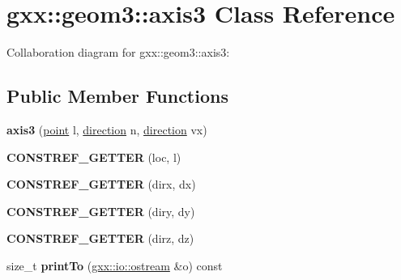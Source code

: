 \hypertarget{classgxx_1_1geom3_1_1axis3}{}\section{gxx\+:\+:geom3\+:\+:axis3 Class Reference}
\label{classgxx_1_1geom3_1_1axis3}


Collaboration diagram for gxx\+:\+:geom3\+:\+:axis3\+:
\subsection*{Public Member Functions}
\begin{DoxyCompactItemize}
\item 
{\bfseries axis3} (\hyperlink{classgxx_1_1geom3_1_1point}{point} l, \hyperlink{classgxx_1_1geom3_1_1direction}{direction} n, \hyperlink{classgxx_1_1geom3_1_1direction}{direction} vx)\hypertarget{classgxx_1_1geom3_1_1axis3_ad60e27afc66929ac5579565719af4be3}{}\label{classgxx_1_1geom3_1_1axis3_ad60e27afc66929ac5579565719af4be3}

\item 
{\bfseries C\+O\+N\+S\+T\+R\+E\+F\+\_\+\+G\+E\+T\+T\+ER} (loc, l)\hypertarget{classgxx_1_1geom3_1_1axis3_ac4a6a1138d9fbb0b5400d953e2de1e4f}{}\label{classgxx_1_1geom3_1_1axis3_ac4a6a1138d9fbb0b5400d953e2de1e4f}

\item 
{\bfseries C\+O\+N\+S\+T\+R\+E\+F\+\_\+\+G\+E\+T\+T\+ER} (dirx, dx)\hypertarget{classgxx_1_1geom3_1_1axis3_a84d77864f3562a9bd409bb4ccb6dc267}{}\label{classgxx_1_1geom3_1_1axis3_a84d77864f3562a9bd409bb4ccb6dc267}

\item 
{\bfseries C\+O\+N\+S\+T\+R\+E\+F\+\_\+\+G\+E\+T\+T\+ER} (diry, dy)\hypertarget{classgxx_1_1geom3_1_1axis3_a1fc769c2c97f01447730bbc2e605239c}{}\label{classgxx_1_1geom3_1_1axis3_a1fc769c2c97f01447730bbc2e605239c}

\item 
{\bfseries C\+O\+N\+S\+T\+R\+E\+F\+\_\+\+G\+E\+T\+T\+ER} (dirz, dz)\hypertarget{classgxx_1_1geom3_1_1axis3_af3bfe0d05e7d33a2c282f5615c76481d}{}\label{classgxx_1_1geom3_1_1axis3_af3bfe0d05e7d33a2c282f5615c76481d}

\item 
size\+\_\+t {\bfseries print\+To} (\hyperlink{classgxx_1_1io_1_1ostream}{gxx\+::io\+::ostream} \&o) const \hypertarget{classgxx_1_1geom3_1_1axis3_af9d74faa5dc4bd0db905acd70f4c3a8b}{}\label{classgxx_1_1geom3_1_1axis3_af9d74faa5dc4bd0db905acd70f4c3a8b}

\end{DoxyCompactItemize}

